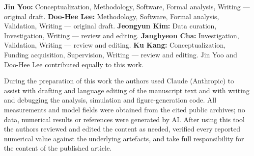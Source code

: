 \documentclass[sn-basic,lineno]{sn-jnl}
\begin{document}
\textbf{Jin Yoo:} Conceptualization, Methodology, Software, Formal analysis, Writing --- original
draft. \textbf{Doo-Hee Lee:} Methodology, Software, Formal analysis, Validation, Writing ---
original draft. \textbf{Jeongyun Kim:} Data curation, Investigation, Writing --- review and
editing. \textbf{Janghyeon Cha:} Investigation, Validation, Writing --- review and editing.
\textbf{Ku Kang:} Conceptualization, Funding acquisition, Supervision, Writing --- review and
editing. Jin Yoo and Doo-Hee Lee contributed equally to this work.

During the preparation of this work the authors used Claude (Anthropic) to assist with drafting
and language editing of the manuscript text and with writing and debugging the analysis,
simulation and figure-generation code. All measurements and model fields were obtained from the
cited public archives; no data, numerical results or references were generated by AI. After
using this tool the authors reviewed and edited the content as needed, verified every reported
numerical value against the underlying artefacts, and take full responsibility for the content
of the published article.


\end{document}
